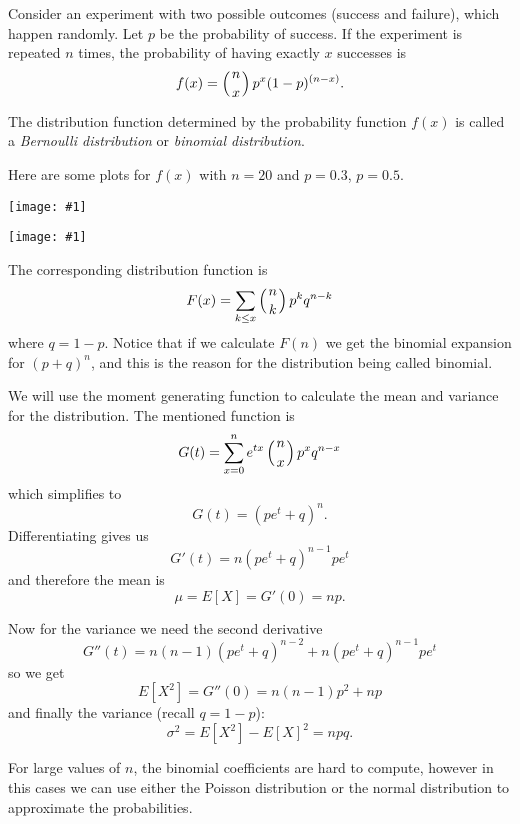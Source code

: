 \documentclass[12pt]{article}
\newcommand{\figuraex}[2]{\begin{center}\texttt{[image: \#1]}\end{center}}
\begin{document}
Consider an experiment with two possible outcomes (success and failure), which happen randomly. Let $p$ be the probability of success. If the experiment is repeated $n$ times, the probability of having exactly $x$ successes is
$$f(x)=\left({n\atop x}\right)p^x(1-p)^{(n-x)}.$$

The distribution function determined by the probability function $f(x)$ is called a \emph{Bernoulli distribution} or \emph{binomial distribution}.

Here are some plots for $f(x)$ with $n=20$ and $p=0.3$, $p=0.5$.
\figuraex{binom10p3}{scale=0.75}
\figuraex{binom10p5}{scale=0.75}

The corresponding distribution function is
$$F(x)=\sum_{k\leq x}\left({n\atop k}\right)p^k q^{n-k}$$
where $q=1-p$. Notice that if we calculate $F(n)$ we get the binomial expansion for $(p+q)^n$, and this is the reason for the distribution being called binomial.

We will use the moment generating function to calculate the mean and variance for the distribution. The mentioned function is
$$G(t)=\sum_{x=0}^n e^{tx}\left({n\atop x}\right)p^x q^{n-x}$$
which simplifies to
$$G(t)=(pe^t+q)^n.$$
Differentiating gives us 
$$G'(t)=n(pe^t+q)^{n-1}pe^t$$
and therefore the mean is
$$\mu = E[X]=G'(0)=np.$$

Now for the variance we need the second derivative
$$G''(t)=n(n-1)(pe^t+q)^{n-2} + n(pe^t+q)^{n-1}pe^t$$
so we get $$E[X^2]=G''(0)=n(n-1)p^2 + np$$
and finally the variance (recall $q=1-p$):
$$\sigma^2 = E[X^2] - E[X]^2 = npq.$$


For large values of $n$, the binomial coefficients are hard to compute, however in this cases we can use either the Poisson distribution or the normal distribution to approximate the probabilities.
\end{document}
